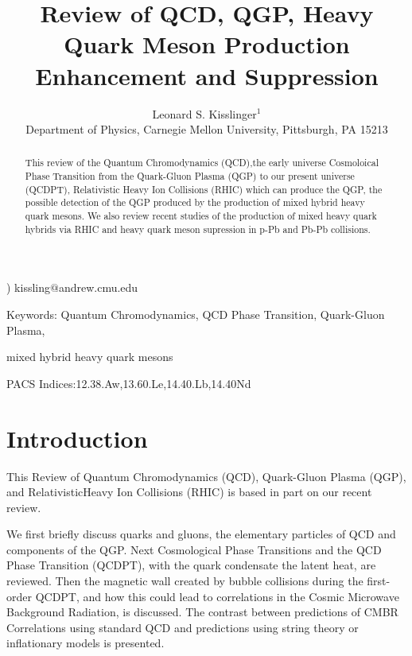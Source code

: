 
\textwidth 6.5in
\textheight 9.0in
\evensidemargin 0.25in
\oddsidemargin 0.25in
\topmargin -0.5in
\newcommand{\beq}{\begin{eqnarray}}
\newcommand{\eeq}{\end{eqnarray}}

\title{Review of QCD, QGP, Heavy Quark Meson Production Enhancement and 
Suppression}
\author{Leonard S. Kisslinger$^{1}$\\
Department of Physics, Carnegie Mellon University, Pittsburgh, PA 15213}
\date{}
\maketitle
\vspace{-1cm}
) kissling$@$andrew.cmu.edu 

\begin{abstract}
  This review of the Quantum Chromodynamics (QCD),the early universe 
Cosmoloical Phase Transition from the  Quark-Gluon Plasma (QGP) to our 
present universe (QCDPT),  Relativistic Heavy Ion Collisions (RHIC) which can 
produce the QGP, the possible detection of the QGP produced by the production 
of mixed hybrid heavy quark mesons. We also review recent studies of the 
production of mixed heavy quark hybrids via RHIC and heavy quark meson 
supression in p-Pb and Pb-Pb collisions.
\end{abstract}

\noindent
Keywords: Quantum Chromodynamics, QCD Phase Transition, Quark-Gluon Plasma,

\noindent
mixed hybrid heavy quark mesons

\vspace{2mm}
\noindent
PACS Indices:12.38.Aw,13.60.Le,14.40.Lb,14.40Nd

\section{Introduction}

  This Review of Quantum Chromodynamics (QCD), Quark-Gluon Plasma (QGP), and 
RelativisticHeavy Ion Collisions (RHIC) is based in part on our recent 
review\cite{kd16}. 

We first briefly discuss quarks and gluons, the elementary
particles of QCD and components of the QGP. Next Cosmological Phase
Transitions and the QCD Phase Transition (QCDPT), with the quark condensate
the latent heat, are reviewed. Then the magnetic wall created by bubble 
collisions during the first-order QCDPT, and how this could lead to 
correlations in the Cosmic Microwave Background Radiation, is discussed.
The contrast between predictions of CMBR Correlations using standard QCD and 
predictions using string theory or inflationary models is presented.

